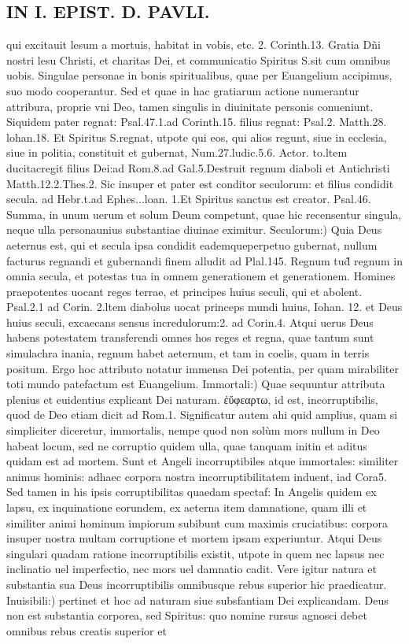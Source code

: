 \documentclass{article}
\begin{document}
\begin{pages}
\section*{IN I. EPIST. D. PAVLI. }
\marginpar{[ p.58 ]}\pstart qui excitauit lesum a mortuis, habitat in vobis, etc. 2. Corinth.13. Gratia Dñi nostri lesu Christi, et charitas Dei, et communicatio Spiritus S.sit cum omnibus uobis. Singulae personae in bonis spiritualibus, quae per Euangelium accipimus, suo modo cooperantur. Sed et quae in hac gratiarum actione numerantur attribura, proprie vni Deo, tamen singulis in diuinitate personis conueniunt. Siquidem pater regnat: Psal.47.1.ad Corinth.15. filius regnat: Psal.2. Matth.28. lohan.18. Et Spiritus S.regnat, utpote qui eos, qui alios regunt, siue in ecclesia, siue in politia, constituit et gubernat, Num.27.ludic.5.6. Actor. to.ltem ducitacregit filius Dei:ad Rom.8.ad Gal.5.Destruit regnum diaboli et Antichristi Matth.12.2.Thes.2. Sic insuper et pater est conditor seculorum: et filius condidit secula. ad Hebr.t.ad Ephes...loan. 1.Et Spiritus sanctus est creator. Psal.46. Summa, in unum uerum et solum Deum competunt, quae hic recensentur singula, neque  ulla personaunius substantiae diuinae eximitur.  \pend\pstart Seculorum:) Quia Deus aeternus est, qui et secula ipsa condidit eademqueperpetuo gubernat, nullum facturus regnandi et gubernandi finem alludit ad Plal.145. Regnum tud̃ regnum in omnia secula, et potestas tua in omnem generationem et generationem. Homines praepotentes uocant reges terrae, et principes huius seculi, qui et abolent. Psal.2.1 ad Corin. 2.ltem diabolus uocat princeps mundi huius, Iohan. 12. et Deus huius seculi, excaecans sensus incredulorum:2. ad Corin.4. Atqui uerus Deus habens potestatem transferendi omnes hos reges et regna, quae tantum sunt simulachra inania, regnum habet aeternum, et tam in coelis, quam in terris positum. Ergo hoc attributo notatur immensa Dei potentia, per quam mirabiliter toti mundo patefactum est Euangelium.  \pend\pstart Immortali:) Quae sequuntur attributa plenius et euidentius explicant Dei naturam. ἐὔφεαρτω, id est, incorruptibilis, quod de Deo etiam dicit ad Rom.1. Significatur autem ahi quid amplius, quam si simpliciter diceretur, immortalis, nempe quod non solùm mors nullum in Deo habeat locum, sed ne corruptio quidem ulla, quae tanquam initin et aditus quidam est ad mortem. Sunt et Angeli incorruptibiles atque  immortales: similiter animus hominis: adhaec corpora nostra incorruptibilitatem induent, iad Cora5. Sed tamen in his ipsis corruptibilitas quaedam spectaf: In Angelis quidem ex lapsu, ex inquinatione eorundem, ex aeterna item damnatione, quam illi et similiter animi hominum impiorum subibunt cum maximis cruciatibus: corpora insuper nostra multam corruptione et mortem ipsam experiuntur. Atqui Deus singulari quadam ratione incorruptibilis existit, utpote in quem nec lapsus nec inclinatio uel imperfectio, nec mors uel damnatio cadit. Vere igitur natura et substantia sua Deus incorruptibilis omnibusque  rebus superior hic praedicatur.  \pend\pstart Inuisibili:) pertinet et hoc ad naturam siue subsfantiam Dei explicandam. Deus non est substantia corporea, sed Spiritus: quo nomine rursus agnosci debet omnibus rebus creatis superior et 
\end{pages}
\end{document}
